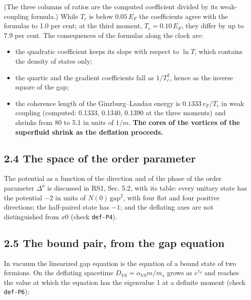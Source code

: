 \documentclass[
  10pt,
]{article}
\providecommand{\tightlist}{%
  \setlength{\itemsep}{0pt}\setlength{\parskip}{0pt}}
\begin{document}
(The three columns of ratios are the computed coefficient divided by its
weak-coupling formula.) While \(T_c\) is below \(0.05\,E_F\) the
coefficients agree with the formulas to 1.0 per cent; at the third
moment, \(T_c=0.10\,E_F\), they differ by up to 7.9 per cent. The
consequences of the formulas along the clock are:

\begin{itemize}
\tightlist
\item
  the quadratic coefficient keeps its slope with respect to \(\ln T\),
  which contains the density of states only;
\item
  the quartic and the gradient coefficients fall as \(1/T_c^2\), hence
  as the inverse square of the gap;
\item
  the coherence length of the Ginzburg--Landau energy is
  \(0.1333\,v_F/T_c\) in weak coupling (computed: 0.1333, 0.1340, 0.1390
  at the three moments) and shrinks from 80 to 5.1 in units of \(1/m\).
  \textbf{The cores of the vortices of the superfluid shrink as the
  deflation proceeds.}
\end{itemize}

\hypertarget{the-space-of-the-order-parameter}{%
\subsection{2.4 The space of the order
parameter}\label{the-space-of-the-order-parameter}}

The potential as a function of the direction and of the phase of the
order parameter \(\Delta^a\) is discussed in RS1, Sec. 5.2, with its
table: every unitary state has the potential \(-2\) in units of
\(N(0)\,\mathrm{gap}^2\), with four flat and four positive directions;
the half-paired state has \(-1\); and the deflating axes are not
distinguished from \(x0\) (check \texttt{def-P4}).

\hypertarget{the-bound-pair-from-the-gap-equation}{%
\subsection{2.5 The bound pair, from the gap
equation}\label{the-bound-pair-from-the-gap-equation}}

In vacuum the linearized gap equation is the equation of a bound state
of two fermions. On the deflating spacetime \(D_{VS}=\alpha_{VS}m/m_s\)
grows as \(e^{\tau_d}\) and reaches the value at which the equation has
the eigenvalue 1 at a definite moment (check \texttt{def-P6}):
\end{document}
